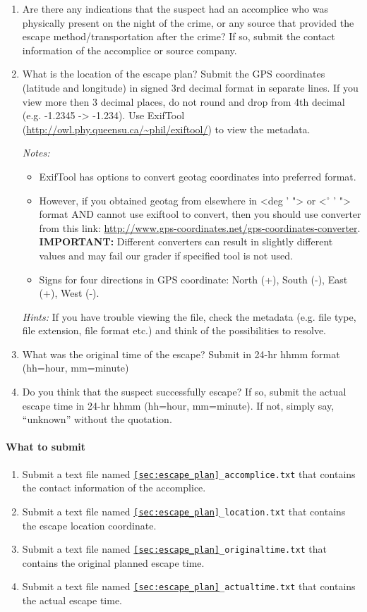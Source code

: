 \documentclass[letterpaper,12pt]{report}
\begin{document}
\begin{enumerate}
\item Are there any indications that the suspect had an accomplice who was physically present on the night of the crime, or any source that provided the escape method/transportation after the crime?  If so, submit the contact information of the accomplice or source company.
\item What is the location of the escape plan? Submit the GPS coordinates (latitude and longitude) in signed 3rd decimal format in separate lines. If you view more then 3 decimal places, do not round and drop from 4th decimal (e.g. -1.2345 -> -1.234). Use ExifTool (\url{http://owl.phy.queensu.ca/~phil/exiftool/}) to view the metadata.

\medskip
\textit{Notes:} 
    \begin{itemize}
        \item ExifTool has options to convert geotag coordinates into preferred format. 
        \item However, if you obtained geotag from elsewhere in <deg ' "> or <$^{\circ}$ ' "> format AND cannot use exiftool to convert, then you should use converter from this link: \url{http://www.gps-coordinates.net/gps-coordinates-converter}. \textbf{IMPORTANT:} Different converters can result in slightly different values and may fail our grader if specified tool is not used.
        \item Signs for four directions in GPS coordinate: North (+), South (-), East (+), West (-).
    \end{itemize}

\textit{Hints:} If you have trouble viewing the file, check the metadata (e.g. file type, file extension, file format etc.) and think of the possibilities to resolve.
\item What was the original time of the escape? Submit in 24-hr hhmm format (hh=hour, mm=minute)
\item Do you think that the suspect successfully escape? If so, submit the actual escape time in 24-hr hhmm (hh=hour, mm=minute). If not, simply say, ``unknown'' without the quotation. 
\end{enumerate}

\paragraph{What to submit}
\begin{enumerate}
\item Submit a text file named \texttt{\ref{sec:escape_plan}\_accomplice.txt} that contains the contact information of the accomplice.
\item Submit a text file named \texttt{\ref{sec:escape_plan}\_location.txt} that contains the escape location coordinate.
\item Submit a text file named \texttt{\ref{sec:escape_plan}\_originaltime.txt} that contains the original planned escape time.
\item Submit a text file named \texttt{\ref{sec:escape_plan}\_actualtime.txt} that contains the actual escape time.
\end{enumerate}
\end{document}
